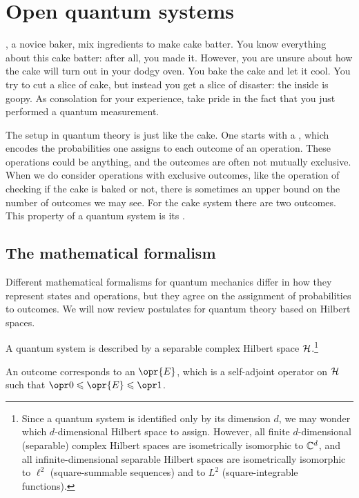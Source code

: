 \documentclass[../thesis.tex]{subfiles}
\begin{document}
\chapter{Open quantum systems}\label{ch:open-quantum-systems}

, a novice baker, mix ingredients to make cake batter. You know
everything about this cake batter: after all, you made it. However, you are
unsure about how the cake will turn out in your dodgy oven. You bake the cake
and let it cool. You try to cut a slice of cake, but instead you get a slice of
disaster: the inside is goopy. As consolation for your experience, take pride in
the fact that you just performed a quantum measurement.

The setup in quantum theory is just like the cake. One starts with a
, which encodes the probabilities one assigns to each
outcome of an operation. These operations could be anything, and the outcomes
are often not mutually exclusive. When we do consider operations with exclusive
outcomes, like the operation of checking if the cake is baked or not, there is
sometimes an upper bound on the number of outcomes we may see. For the cake
system there are two outcomes. This property of a quantum system is its
.


\section{The mathematical formalism}

Different mathematical formalisms for quantum mechanics differ in how they
represent states and operations, but they agree on the assignment of
probabilities to outcomes. We will now review postulates for quantum theory
based on Hilbert spaces.
\begin{post}\label{post:hilb}
  A quantum system is described by a separable complex Hilbert space
  $\mathcal{H}$.\footnote{%
    Since a quantum system is identified only by its dimension $d$, we may
    wonder which $d$-dimensional Hilbert space to assign. However, all finite
    $d$-dimensional (separable) complex Hilbert spaces are isometrically
    isomorphic to $\mathbb{C}^d$, and all infinite-dimensional separable Hilbert spaces
    are isometrically isomorphic to $\ell^2$ (square-summable sequences) and
    to $L^2$ (square-integrable functions).
  }
\end{post}

\begin{post}\label{post:effects}
  An outcome corresponds to an  $\opr{E}$, which is a self-adjoint
  operator on $\mathcal{H}$ such that $\zopr \le \opr{E} \le \idopr$.\footnotemark%
\end{post}
\end{document}
